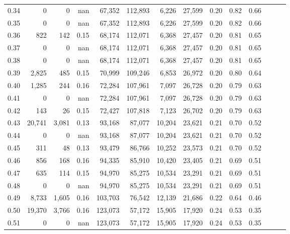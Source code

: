 \begin{tabular}{rrrrrrrrrrrrrr}
0.34 &       0 &      0 &   nan &   67,352 &  112,893 &   6,226 &  27,599 &  0.20 &  0.82 &      0.66 \\
0.35 &       0 &      0 &   nan &   67,352 &  112,893 &   6,226 &  27,599 &  0.20 &  0.82 &      0.66 \\
0.36 &     822 &    142 &  0.15 &   68,174 &  112,071 &   6,368 &  27,457 &  0.20 &  0.81 &      0.65 \\
0.37 &       0 &      0 &   nan &   68,174 &  112,071 &   6,368 &  27,457 &  0.20 &  0.81 &      0.65 \\
0.38 &       0 &      0 &   nan &   68,174 &  112,071 &   6,368 &  27,457 &  0.20 &  0.81 &      0.65 \\
0.39 &   2,825 &    485 &  0.15 &   70,999 &  109,246 &   6,853 &  26,972 &  0.20 &  0.80 &      0.64 \\
0.40 &   1,285 &    244 &  0.16 &   72,284 &  107,961 &   7,097 &  26,728 &  0.20 &  0.79 &      0.63 \\
0.41 &       0 &      0 &   nan &   72,284 &  107,961 &   7,097 &  26,728 &  0.20 &  0.79 &      0.63 \\
0.42 &     143 &     26 &  0.15 &   72,427 &  107,818 &   7,123 &  26,702 &  0.20 &  0.79 &      0.63 \\
0.43 &  20,741 &  3,081 &  0.13 &   93,168 &   87,077 &  10,204 &  23,621 &  0.21 &  0.70 &      0.52 \\
0.44 &       0 &      0 &   nan &   93,168 &   87,077 &  10,204 &  23,621 &  0.21 &  0.70 &      0.52 \\
0.45 &     311 &     48 &  0.13 &   93,479 &   86,766 &  10,252 &  23,573 &  0.21 &  0.70 &      0.52 \\
0.46 &     856 &    168 &  0.16 &   94,335 &   85,910 &  10,420 &  23,405 &  0.21 &  0.69 &      0.51 \\
0.47 &     635 &    114 &  0.15 &   94,970 &   85,275 &  10,534 &  23,291 &  0.21 &  0.69 &      0.51 \\
0.48 &       0 &      0 &   nan &   94,970 &   85,275 &  10,534 &  23,291 &  0.21 &  0.69 &      0.51 \\
0.49 &   8,733 &  1,605 &  0.16 &  103,703 &   76,542 &  12,139 &  21,686 &  0.22 &  0.64 &      0.46 \\
0.50 &  19,370 &  3,766 &  0.16 &  123,073 &   57,172 &  15,905 &  17,920 &  0.24 &  0.53 &      0.35 \\
0.51 &       0 &      0 &   nan &  123,073 &   57,172 &  15,905 &  17,920 &  0.24 &  0.53 &      0.35 \\

\end{tabular}
